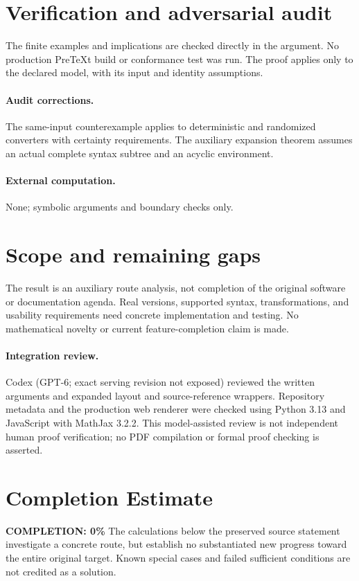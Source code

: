 \documentclass[11pt]{article}
\begin{document}
\section{Verification and adversarial audit}
The finite examples and implications are checked directly in the argument. No production PreTeXt build or conformance test was run. The proof applies only to the declared model, with its input and identity assumptions.
\paragraph{Audit corrections.} The same-input counterexample applies to deterministic and randomized converters with certainty requirements. The auxiliary expansion theorem assumes an actual complete syntax subtree and an acyclic environment.
\paragraph{External computation.} None; symbolic arguments and boundary checks only.
\section{Scope and remaining gaps}
The result is an auxiliary route analysis, not completion of the original software or documentation agenda. Real versions, supported syntax, transformations, and usability requirements need concrete implementation and testing. No mathematical novelty or current feature-completion claim is made.
\paragraph{Integration review.} Codex (GPT-6; exact serving revision not exposed) reviewed the written arguments and expanded layout and source-reference wrappers. Repository metadata and the production web renderer were checked using Python 3.13 and JavaScript with MathJax 3.2.2. This model-assisted review is not independent human proof verification; no PDF compilation or formal proof checking is asserted.

\section{Completion Estimate}
\noindent\textbf{COMPLETION: 0\%}
The calculations below the preserved source statement investigate a concrete route,
but establish no substantiated new progress toward the entire original target.
Known special cases and failed sufficient conditions are not credited as a solution.
\end{document}
